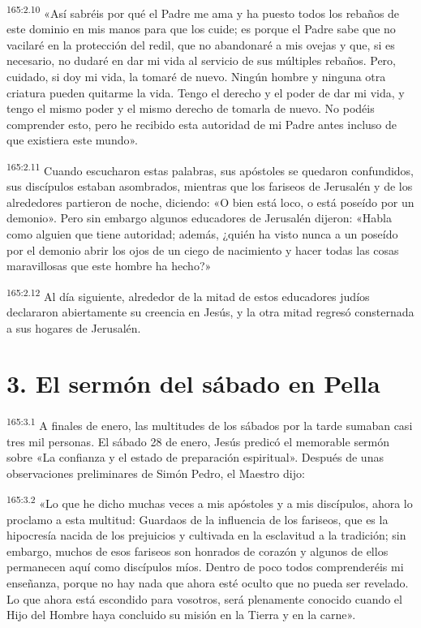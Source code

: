 \par 
\textsuperscript{165:2.10} «Así sabréis por qué el Padre me ama y ha puesto todos los rebaños de este dominio en mis manos para que los cuide; es porque el Padre sabe que no vacilaré en la protección del redil, que no abandonaré a mis ovejas y que, si es necesario, no dudaré en dar mi vida al servicio de sus múltiples rebaños. Pero, cuidado, si doy mi vida, la tomaré de nuevo. Ningún hombre y ninguna otra criatura pueden quitarme la vida. Tengo el derecho y el poder de dar mi vida, y tengo el mismo poder y el mismo derecho de tomarla de nuevo. No podéis comprender esto, pero he recibido esta autoridad de mi Padre antes incluso de que existiera este mundo».

\par 
\textsuperscript{165:2.11} Cuando escucharon estas palabras, sus apóstoles se quedaron confundidos, sus discípulos estaban asombrados, mientras que los fariseos de Jerusalén y de los alrededores partieron de noche, diciendo: «O bien está loco, o está poseído por un demonio». Pero sin embargo algunos educadores de Jerusalén dijeron: «Habla como alguien que tiene autoridad; además, ¿quién ha visto nunca a un poseído por el demonio abrir los ojos de un ciego de nacimiento y hacer todas las cosas maravillosas que este hombre ha hecho?»

\par 
\textsuperscript{165:2.12} Al día siguiente, alrededor de la mitad de estos educadores judíos declararon abiertamente su creencia en Jesús, y la otra mitad regresó consternada a sus hogares de Jerusalén.

\section*{3. El sermón del sábado en Pella}
\par 
\textsuperscript{165:3.1} A finales de enero, las multitudes de los sábados por la tarde sumaban casi tres mil personas. El sábado 28 de enero, Jesús predicó el memorable sermón sobre «La confianza y el estado de preparación espiritual». Después de unas observaciones preliminares de Simón Pedro, el Maestro dijo:

\par 
\textsuperscript{165:3.2} «Lo que he dicho muchas veces a mis apóstoles y a mis discípulos, ahora lo proclamo a esta multitud: Guardaos de la influencia de los fariseos, que es la hipocresía nacida de los prejuicios y cultivada en la esclavitud a la tradición; sin embargo, muchos de esos fariseos son honrados de corazón y algunos de ellos permanecen aquí como discípulos míos. Dentro de poco todos comprenderéis mi enseñanza, porque no hay nada que ahora esté oculto que no pueda ser revelado. Lo que ahora está escondido para vosotros, será plenamente conocido cuando el Hijo del Hombre haya concluido su misión en la Tierra y en la carne».

